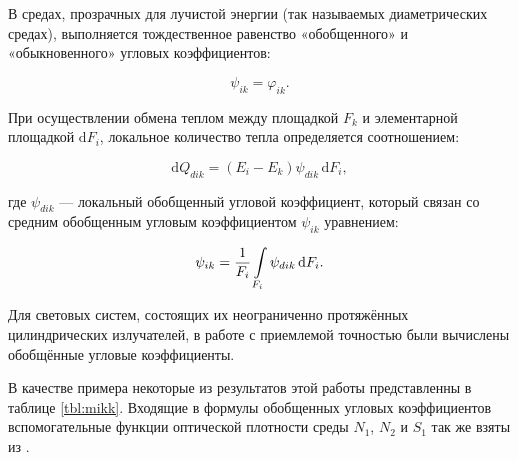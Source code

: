В средах, прозрачных для лучистой энергии (так называемых диаметрических средах), выполняется тождественное равенство «обобщенного» и «обыкновенного» угловых коэффициентов:

\begin{equation}
	\psi_{ik} = \varphi_{ik}.
\end{equation}

При осуществлении обмена теплом между площадкой $F_k$ и элементарной площадкой $\mathrm dF_i$, локальное количество тепла определяется соотношением:

\begin{equation}
	\mathrm dQ_{dik} = (E_i - E_k) \psi_{dik} \,\mathrm dF_i,
\end{equation}

\noindent где $\psi_{dik}$ — локальный обобщенный угловой коэффициент, который связан со средним обобщенным угловым коэффициентом $\psi_{ik}$ уравнением:

\begin{equation}
	\psi_{ik} = \frac{1}{F_i} \int\displaylimits_{F_i} \psi_{dik} \,\mathrm dF_i.
\end{equation}

Для световых систем, состоящих их неограниченно протяжённых цилиндрических излучателей, в работе \cite{mikk} с приемлемой точностью были вычислены обобщённые угловые коэффициенты.

В качестве примера некоторые из результатов этой работы представленны в таблице \ref{tbl:mikk}.
Входящие в формулы обобщенных угловых коэффициентов вспомогательные функции оптической плотности среды $N_1$, $N_2$ и $S_1$ так же взяты из \cite{mikk}.

